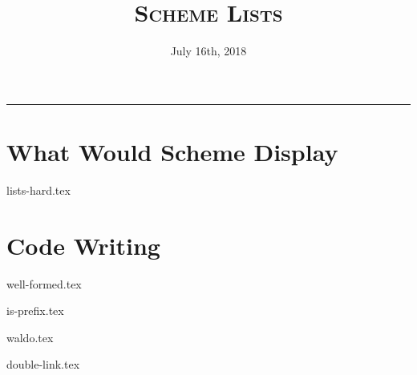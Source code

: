 \documentclass{exam}
\title{\textsc{Scheme Lists}}
\date{July 16th, 2018}
\begin{document}
\maketitle
\rule{\textwidth}{0.15em}
\fontsize{12}{15}\selectfont


\begin{questions}

\section{What Would Scheme Display}
{lists-hard.tex}


\section{Code Writing}

{well-formed.tex}

{is-prefix.tex}

{waldo.tex}

{double-link.tex}


\end{questions}


\end{document}

